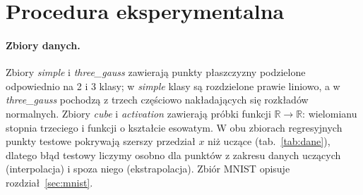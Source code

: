 \documentclass{article}
\begin{document}
\section{Procedura eksperymentalna}
\label{sec:procedura}

\paragraph{Zbiory danych.} Zbiory \emph{simple} i \emph{three\_gauss} zawierają punkty
płaszczyzny podzielone odpowiednio na 2 i 3 klasy; w \emph{simple} klasy są rozdzielone prawie
liniowo, a w \emph{three\_gauss} pochodzą z trzech częściowo nakładających się rozkładów normalnych.
Zbiory \emph{cube} i \emph{activation} zawierają próbki funkcji $\mathbb{R}\to\mathbb{R}$:
wielomianu stopnia trzeciego i funkcji o kształcie esowatym. W obu zbiorach regresyjnych punkty
testowe pokrywają szerszy przedział $x$ niż uczące (tab.~\ref{tab:dane}), dlatego błąd testowy
liczymy osobno dla punktów z zakresu danych uczących (interpolacja) i spoza niego (ekstrapolacja).
Zbiór MNIST opisuje rozdział~\ref{sec:mnist}.

\begin{table}[htbp]
\centering
{}
\caption{Zbiory danych części pierwszej.}
\label{tab:dane}
\end{table}
\end{document}
